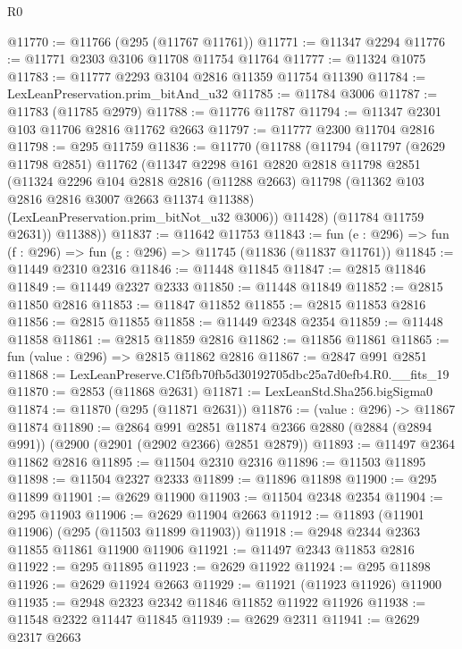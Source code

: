 \begin{lexlean}{R0}
\begin{coremodule}
@11770 := @11766 (@295 (@11767 @11761))
@11771 := @11347 @2294
@11776 := @11771 @2303 @3106 @11708 @11754 @11764
@11777 := @11324 @1075
@11783 := @11777 @2293 @3104 @2816 @11359 @11754 @11390
@11784 := LexLeanPreservation.prim_bitAnd_u32
@11785 := @11784 @3006
@11787 := @11783 (@11785 @2979)
@11788 := @11776 @11787
@11794 := @11347 @2301 @103 @11706 @2816 @11762 @2663
@11797 := @11777 @2300 @11704 @2816
@11798 := @295 @11759
@11836 := @11770
    (@11788
      (@11794
        (@11797
          (@2629 @11798 @2851)
          @11762
          (@11347
            @2298
            @161
            @2820
            @2818
            @11798
            @2851
            (@11324
              @2296
              @104
              @2818
              @2816
              (@11288 @2663)
              @11798
              (@11362 @103 @2816 @2816 @3007 @2663 @11374 @11388)
              (LexLeanPreservation.prim_bitNot_u32 @3006))
            @11428)
          (@11784 @11759 @2631))
        @11388))
@11837 := @11642 @11753
@11843 := fun (e : @296) => fun (f : @296) => fun (g : @296) => @11745 (@11836 (@11837 @11761))
@11845 := @11449 @2310 @2316
@11846 := @11448 @11845
@11847 := @2815 @11846
@11849 := @11449 @2327 @2333
@11850 := @11448 @11849
@11852 := @2815 @11850 @2816
@11853 := @11847 @11852
@11855 := @2815 @11853 @2816
@11856 := @2815 @11855
@11858 := @11449 @2348 @2354
@11859 := @11448 @11858
@11861 := @2815 @11859 @2816
@11862 := @11856 @11861
@11865 := fun (value : @296) => @2815 @11862 @2816
@11867 := @2847 @991 @2851
@11868 := LexLeanPreserve.C1f5fb70fb5d30192705dbc25a7d0efb4.R0.__fits_19
@11870 := @2853 (@11868 @2631)
@11871 := LexLeanStd.Sha256.bigSigma0
@11874 := @11870 (@295 (@11871 @2631))
@11876 := (value : @296) -> @11867 @11874
@11890 := @2864
    @991
    @2851
    @11874
    @2366
    @2880
    (@2884 (@2894 @991))
    (@2900 (@2901 (@2902 @2366) @2851 @2879))
@11893 := @11497 @2364 @11862 @2816
@11895 := @11504 @2310 @2316
@11896 := @11503 @11895
@11898 := @11504 @2327 @2333
@11899 := @11896 @11898
@11900 := @295 @11899
@11901 := @2629 @11900
@11903 := @11504 @2348 @2354
@11904 := @295 @11903
@11906 := @2629 @11904 @2663
@11912 := @11893 (@11901 @11906) (@295 (@11503 @11899 @11903))
@11918 := @2948 @2344 @2363 @11855 @11861 @11900 @11906
@11921 := @11497 @2343 @11853 @2816
@11922 := @295 @11895
@11923 := @2629 @11922
@11924 := @295 @11898
@11926 := @2629 @11924 @2663
@11929 := @11921 (@11923 @11926) @11900
@11935 := @2948 @2323 @2342 @11846 @11852 @11922 @11926
@11938 := @11548 @2322 @11447 @11845
@11939 := @2629 @2311
@11941 := @2629 @2317 @2663

\end{coremodule}
\end{lexlean}
